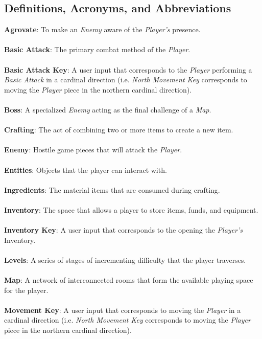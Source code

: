 \documentclass[12pt, titlepage]{article}
\begin{document}
  \subsection{Definitions, Acronyms, and Abbreviations}
   
    \textbf{Agrovate}: To make an \textit{Enemy} aware of the \textit{Player's} presence. \\\\
    \textbf{Basic Attack}: The primary combat method of the \textit{Player}. \\\\
    \textbf{Basic Attack Key}: A user input that corresponds to the \textit{Player} performing a \textit{Basic Attack} in a cardinal direction (i.e. \textit{North Movement Key} corresponds to moving the \textit{Player} piece in the northern cardinal direction). \\\\
    \textbf{Boss}: A specialized \textit{Enemy} acting as the final challenge of a \textit{Map}. \\\\
    \textbf{Crafting}: The act of combining two or more items to create a new item.\\\\
    \textbf{Enemy}: Hostile game pieces that will attack the \textit{Player}. \\\\
    \textbf{Entities}: Objects that the player can interact with.\\\\
    \textbf{Ingredients}: The material items that are consumed during crafting.\\\\
    \textbf{Inventory}: The space that allows a player to store items, funds, and equipment.\\\\
    \textbf{Inventory Key}: A user input that corresponds to the opening the \textit{Player's} Inventory. \\\\
    \textbf{Levels}: A series of stages of incrementing difficulty that the player traverses.\\\\
    \textbf{Map}: A network of interconnected rooms that form the available playing space for the player.\\\\
    \textbf{Movement Key}: A user input that corresponds to moving the \textit{Player} in a cardinal direction (i.e. \textit{North Movement Key} corresponds to moving the \textit{Player} piece in the northern cardinal direction). \\\\
\end{document}
